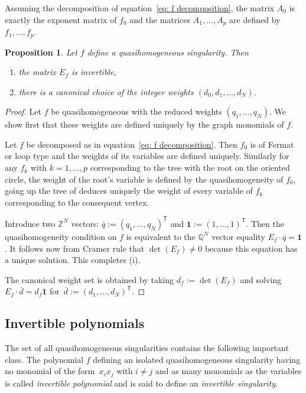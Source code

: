 \documentclass[10pt,a4paper]{amsart}
\numberwithin{equation}{section}
\newtheorem{Proposition}[Theorem]{Proposition}
 { \theoremstyle{definition}
\newtheorem{Definition}[Theorem]{Definition}
\newtheorem{Note}[Theorem]{Note}
\newtheorem{Example}[Theorem]{Example}
\newtheorem{Remark}[Theorem]{Remark} }
\newcommand{\QQ}{{\mathbb{Q}}}
\newcommand{\ZZ}{{\mathbb{Z}}}
\begin{document}
Assuming the decomposition of equation~\eqref{eq: f decomposition}, the matrix $A_0$ is exactly the exponent matrix of $f_0$ and the matrices $A_1,\dots,A_p$ are defined by $f_1,\dots,f_p$.

\begin{Proposition}\label{prop: graph exponent matrix is invertible}
	Let $f$ define a quasihomogeneous singularity. Then
	\begin{enumerate}\itemsep=0pt
	 \item[$(i)$] the matrix $E_f$ is invertible,
	 \item[$(ii)$] there is a canonical choice of the integer weights $(d_0,d_1,\dots,d_N)$.
	\end{enumerate}
\end{Proposition}
\begin{proof}
	Let $f$ be quasihomogeneous with the reduced weights $(q_1,\dots,q_N)$. We show first that these weights are defined uniquely by the graph monomials of $f$.


 Let $f$ be decomposed as in equation~\eqref{eq: f decomposition}. Then $f_0$ is of Fermat or loop type and the weights of its variables are defined uniquely. Similarly for any $f_k$ with $k=1,\dots,p$ corresponding to the tree with the root on the oriented circle, the weight of the root's variable is defined by the quasihomogeneity of $f_0$, going up the tree of deduces uniquely the weight of every variable of $f_k$ corresponding to the consequent vertex.

 Introduce two $\ZZ^N$ vectors: $\overline{q} := (q_1,\dots,q_N)^{\mathsf{T}}$ and $\boldsymbol{1} := (1,\dots,1)^{\mathsf{T}}$. Then the quasihomogeneity condition on $f$ is equivalent to the $\QQ^N$ vector equality $E_f \cdot \overline{q} = \boldsymbol{1}$. It follows now from Cramer rule that $\det(E_f) \neq 0$ because this equation has a unique solution. This completes (i).

	The canonical weight set is obtained by taking $d_f := \det(E_f)$ and solving $E_f \cdot \overline{d} = d_f \boldsymbol{1}$ for~$\overline{d} := (d_1,\dots,d_N)^{\mathsf{T}}$.
\end{proof}

\subsection{Invertible polynomials}\label{sec: invertible polynomials}

The set of all quasihomogeneous singularities contains the following important class. The polynomial $f$ defining an isolated quasihomogeneous singularity having no monomial of the form~$x_ix_j$ with $i\ne j$ and as many monomials as the variables is called \textit{invertible polynomial} and is said to define an \textit{invertible singularity}.
\end{document}
